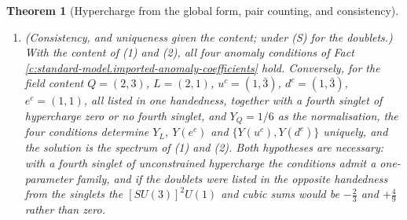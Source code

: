 \documentclass[11pt]{article}
\newtheorem{theorem}{Theorem}[section]
\theoremstyle{definition}
\theoremstyle{plain}
\providecommand{\C}{}\renewcommand{\C}{\mathbb{C}}
\begin{document}
\begin{theorem}[Hypercharge from the global form, pair counting, and consistency]
\begin{enumerate}
\[\]
that is $\nu^{c}$, $u^{c}$, $d^{c}$, $e^{c}$ with hypercharges $0, -\tfrac23, +\tfrac13, +1$: the observed singlet spectrum, with the fourth singlet at hypercharge zero. (The listing by the opposite handedness is the conjugate of this one, the same spectrum in the opposite convention.) Under (S) the grade-$k$ states of a single conformal spinor are the $(0, k)$ components, the states with no slot mode and $k$ pair modes occupied (their content $\Lambda^{k}\C^{3}$ and weight $-2k$ match, and irreducibles are determined by content and weight), so their parity is the total parity and this listing is the same listing as in (1).
\item (Consistency, and uniqueness given the content; under (S) for the doublets.) With the content of (1) and (2), all four anomaly conditions of Fact \ref{c:standard-model.imported-anomaly-coefficients} hold. Conversely, for the field content $Q = (2,3)$, $L = (2,1)$, $u^{c} = (1,\bar{3})$, $d^{c} = (1,\bar{3})$, $e^{c} = (1,1)$, all listed in one handedness, together with a fourth singlet of hypercharge zero or no fourth singlet, and $Y_{Q} = 1/6$ as the normalisation, the four conditions determine $Y_{L}$, $Y(e^{c})$ and $\{Y(u^{c}), Y(d^{c})\}$ uniquely, and the solution is the spectrum of (1) and (2). Both hypotheses are necessary: with a fourth singlet of unconstrained hypercharge the conditions admit a one-parameter family, and if the doublets were listed in the opposite handedness from the singlets the $[SU(3)]^{2}U(1)$ and cubic sums would be $-\tfrac23$ and $+\tfrac49$ rather than zero.
\end{enumerate}
\end{theorem}
\end{document}
